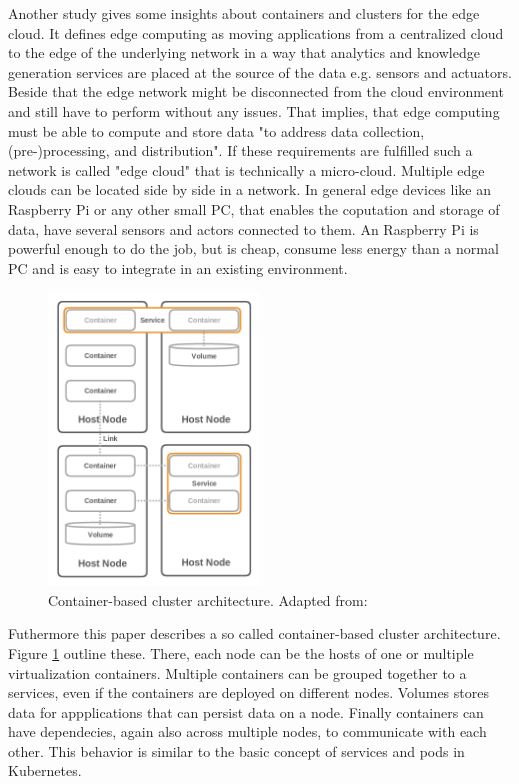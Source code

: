 Another study \autocite{Pahl:2015} gives some insights about containers and clusters for the edge cloud.
It defines edge computing as moving applications from a centralized cloud to the edge of the underlying network in a way that analytics and knowledge generation services are placed at the source of the data e.g. sensors and actuators.\autocite[cf.][p. 380]{Pahl:2015}
Beside that the edge network might be disconnected from the cloud environment and still have to perform without any issues.
That implies, that edge computing must be able to compute and store data "to address data collection, (pre-)processing, and distribution"\autocite[p. 380]{Pahl:2015}.
If these requirements are fulfilled such a network is called "edge cloud" that is technically a micro-cloud.\autocite[cf.][p. 121]{Pahl:2016}
Multiple edge clouds can be located side by side in a network.
In general edge devices like an Raspberry Pi or any other small \ac{PC}, that enables the coputation and storage of data, have several sensors and actors connected to them.
An Raspberry Pi is powerful enough to do the job, but is cheap, consume less energy than a normal \ac{PC} and is easy to integrate in an existing environment.\autocite[cf.][p. 118]{Pahl:2016}

\begin{figure}[H]
    \centering
    \includegraphics[width=0.5\textwidth]{resources/images/container_based_cluster_architecture.png}
    \caption[Container-based cluster architecture]{Container-based cluster architecture. Adapted from: \autocite[p. 384]{Pahl:2015}}
    \label{fig:container_based_cluster_architecture}
\end{figure}

Futhermore this paper describes a so called container-based cluster architecture\autocite[p. 384]{Pahl:2015}.
Figure \ref{fig:container_based_cluster_architecture} outline these.
There, each node can be the hosts of one or multiple virtualization containers.
Multiple containers can be grouped together to a services, even if the containers are deployed on different nodes.\autocite[cf.][p. 384]{Pahl:2015}
Volumes stores data for appplications that can persist data on a node.\autocite[cf.][p. 384]{Pahl:2015}
Finally containers can have dependecies, again also across multiple nodes, to communicate with each other.\autocite[cf.][p. 384]{Pahl:2015}
This behavior is similar to the basic concept of services and pods in Kubernetes.

